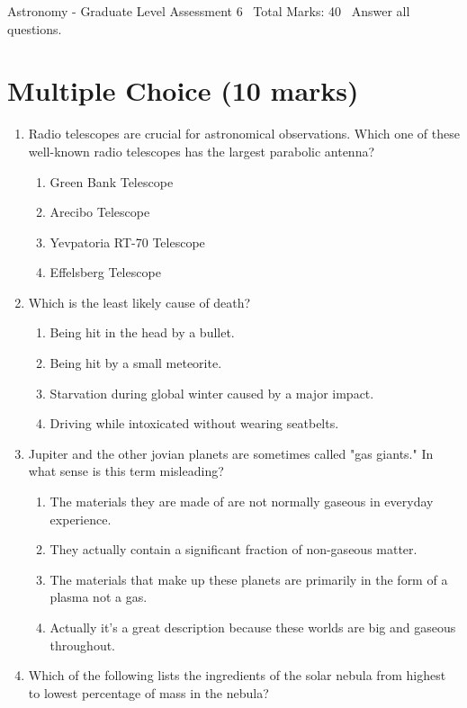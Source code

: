 \documentclass[12pt]{article}
\begin{document}
\begin{center}
Astronomy - Graduate Level Assessment 6 \
Total Marks: 40 \
Answer all questions.
\end{center}

\section*{Multiple Choice (10 marks)}
\begin{enumerate}[label=\arabic*.]
\item Radio telescopes are crucial for astronomical observations. Which one of these well-known radio telescopes has the largest parabolic antenna?
\begin{enumerate}[label=(\alph*)]
    \item Green Bank Telescope
    \item Arecibo Telescope
    \item Yevpatoria RT-70 Telescope
    \item Effelsberg Telescope
\end{enumerate}
\item Which is the least likely cause of death?
\begin{enumerate}[label=(\alph*)]
    \item Being hit in the head by a bullet.
    \item Being hit by a small meteorite.
    \item Starvation during global winter caused by a major impact.
    \item Driving while intoxicated without wearing seatbelts.
\end{enumerate}
\item Jupiter and the other jovian planets are sometimes called "gas giants." In what sense is this term misleading?
\begin{enumerate}[label=(\alph*)]
    \item The materials they are made of are not normally gaseous in everyday experience.
    \item They actually contain a significant fraction of non-gaseous matter.
    \item The materials that make up these planets are primarily in the form of a plasma not a gas.
    \item Actually it's a great description because these worlds are big and gaseous throughout.
\end{enumerate}
\item Which of the following lists the ingredients of the solar nebula from highest to lowest percentage of mass in the nebula?

\end{enumerate}
\end{document}
